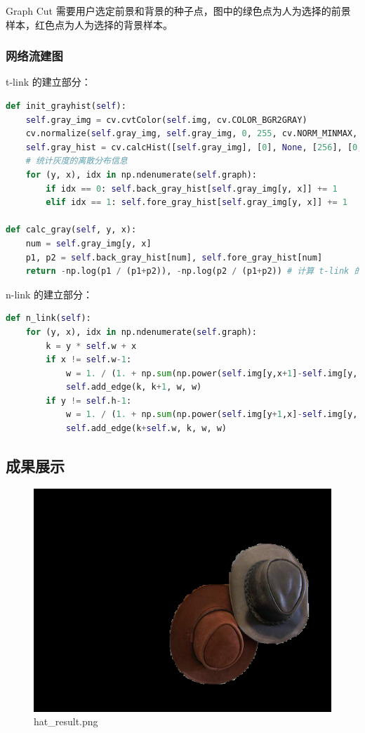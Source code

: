 \documentclass[lang=cn,11pt,a4paper]{elegantpaper}
\begin{document}
Graph Cut 需要用户选定前景和背景的种子点，图中的绿色点为人为选择的前景样本，红色点为人为选择的背景样本。

\subsubsection{网络流建图}

t-link 的建立部分：

\begin{lstlisting}[language=Python]
def init_grayhist(self):
    self.gray_img = cv.cvtColor(self.img, cv.COLOR_BGR2GRAY)
    cv.normalize(self.gray_img, self.gray_img, 0, 255, cv.NORM_MINMAX, cv.CV_8U)
    self.gray_hist = cv.calcHist([self.gray_img], [0], None, [256], [0, 256])
    # 统计灰度的离散分布信息
    for (y, x), idx in np.ndenumerate(self.graph):
        if idx == 0: self.back_gray_hist[self.gray_img[y, x]] += 1
        elif idx == 1: self.fore_gray_hist[self.gray_img[y, x]] += 1
            
def calc_gray(self, y, x):
    num = self.gray_img[y, x]
    p1, p2 = self.back_gray_hist[num], self.fore_gray_hist[num]
    return -np.log(p1 / (p1+p2)), -np.log(p2 / (p1+p2)) # 计算 t-link 的边权
\end{lstlisting}

n-link 的建立部分：

\begin{lstlisting}[language=Python]
def n_link(self):
    for (y, x), idx in np.ndenumerate(self.graph):
        k = y * self.w + x
        if x != self.w-1:
            w = 1. / (1. + np.sum(np.power(self.img[y,x+1]-self.img[y, x],2) / 2))
            self.add_edge(k, k+1, w, w)
        if y != self.h-1:
            w = 1. / (1. + np.sum(np.power(self.img[y+1,x]-self.img[y, x],2) / 2))
            self.add_edge(k+self.w, k, w, w)
\end{lstlisting}

\subsection{成果展示}

\begin{figure}[ht]
	\centering
	\includegraphics[width=0.45\linewidth]{image/hat_result.png}
	\caption{hat\_result.png}
\end{figure}
\end{document}
